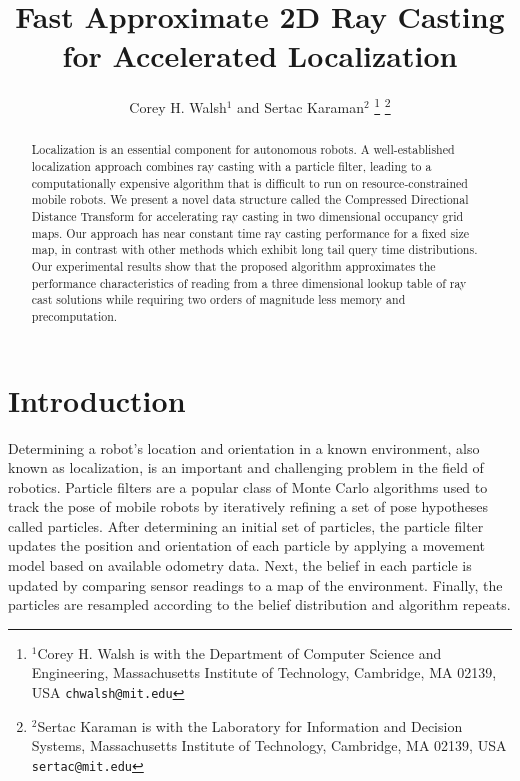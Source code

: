 \documentclass[letterpaper, 10 pt, conference]{ieeeconf}  %
\title{\LARGE \bf
Fast Approximate 2D Ray Casting for Accelerated Localization
}
\author{Corey H. Walsh$^{1}$ and Sertac Karaman$^{2}$%
\thanks{$^{1}$Corey H. Walsh is with the Department of Computer Science and Engineering, Massachusetts Institute of Technology,
        Cambridge, MA 02139, USA
        {\tt\small chwalsh@mit.edu}}%
\thanks{$^{2}$Sertac Karaman is with the Laboratory for Information and Decision Systems, Massachusetts Institute of Technology,
        Cambridge, MA 02139, USA
        {\tt\small sertac@mit.edu}}%
}
\begin{document}
\maketitle
\thispagestyle{empty}
\pagestyle{empty}

\begin{abstract}


Localization is an essential component for autonomous robots. A well-established localization approach combines ray casting with a particle filter, leading to a computationally expensive algorithm that is difficult to run on resource-constrained mobile robots. We present a novel data structure called the Compressed Directional Distance Transform for accelerating ray casting in two dimensional occupancy grid maps. Our approach has near constant time ray casting performance for a fixed size map, in contrast with other methods which exhibit long tail query time distributions. Our experimental results show that the proposed algorithm approximates the performance characteristics of reading from a three dimensional lookup table of ray cast solutions while requiring two orders of magnitude less memory and precomputation.


\end{abstract}

\section{Introduction}

Determining a robot's location and orientation in a known environment, also known as localization, is an important and challenging problem in the field of robotics. Particle filters are a popular class of Monte Carlo algorithms used to track the pose of mobile robots by iteratively refining a set of pose hypotheses called particles. After determining an initial set of particles, the particle filter updates the position and orientation of each particle by applying a movement model based on available odometry data. Next, the belief in each particle is updated by comparing sensor readings to a map of the environment. Finally, the particles are resampled according to the belief distribution and algorithm repeats.
\end{document}
